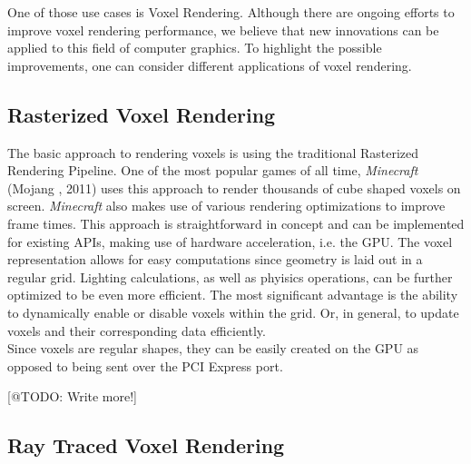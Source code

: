 \noindent
One of those use cases is Voxel Rendering. Although there are ongoing efforts to improve voxel 
rendering performance, we believe that new innovations can be applied to this field of computer 
graphics. To highlight the possible improvements, one can consider different applications of 
voxel rendering. 

\subsection{Rasterized Voxel Rendering}

The basic approach to rendering voxels is using the traditional Rasterized Rendering Pipeline.
One of the most popular games of all time, \emph{Minecraft} (Mojang \cite{Mojang2024}, 2011) uses this approach to 
render thousands of cube shaped voxels on screen. \emph{Minecraft} also makes use of various rendering 
optimizations to improve frame times. This approach is straightforward in concept and can be 
implemented for existing \ac{API}s, making use of hardware acceleration, i.e. the \ac{GPU}.
The voxel representation allows for easy computations since geometry is laid out in a regular grid.
Lighting calculations, as well as phyisics operations, can be further optimized to be even more 
efficient. The most significant advantage is the ability to dynamically enable or disable voxels 
within the grid. Or, in general, to update voxels and their corresponding data efficiently.\\

\noindent
Since voxels are regular shapes, they can be easily created on the \ac{GPU} as opposed to being 
sent over the \ac{PCI Express} port. 

[@TODO: Write more!]


\subsection{Ray Traced Voxel Rendering}

